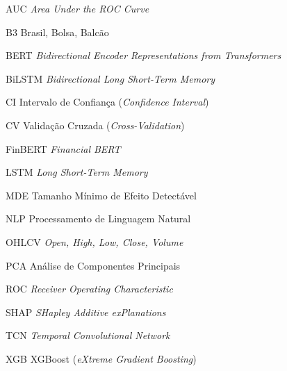 \listoffigures*
\cleardoublepage

\listoftables*
\cleardoublepage

\begin{siglas}
    \item[AUC] \textit{Area Under the ROC Curve}
    \item[B3] Brasil, Bolsa, Balcão
    \item[BERT] \textit{Bidirectional Encoder Representations from Transformers}
    \item[BiLSTM] \textit{Bidirectional Long Short-Term Memory}
    \item[CI] Intervalo de Confiança (\textit{Confidence Interval})
    \item[CV] Validação Cruzada (\textit{Cross-Validation})
    \item[FinBERT] \textit{Financial BERT}
    \item[LSTM] \textit{Long Short-Term Memory}
    \item[MDE] Tamanho Mínimo de Efeito Detectável
    \item[NLP] Processamento de Linguagem Natural
    \item[OHLCV] \textit{Open, High, Low, Close, Volume}
    \item[PCA] Análise de Componentes Principais
    \item[ROC] \textit{Receiver Operating Characteristic}
    \item[SHAP] \textit{SHapley Additive exPlanations} \cite{lundberg2017}
    \item[TCN] \textit{Temporal Convolutional Network}
    \item[XGB] XGBoost (\textit{eXtreme Gradient Boosting})
\end{siglas}

\tableofcontents*
\cleardoublepage
